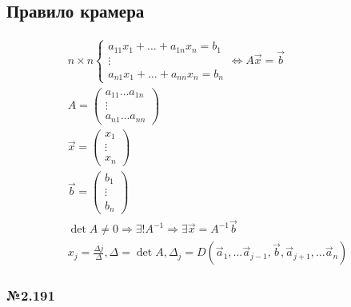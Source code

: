 \documentclass{article}
\begin{document}
\subsection{Правило крамера}

\begin{gather*}
	n \times n \begin{cases}
		a_{11} x_1 + \dots + a_{1n} x_n = b_1 \\
		\vdots \\
		a_{n1} x_1 + \dots + a_{nn} x_n = b_n
	\end{cases}
	\Leftrightarrow
	A \vec{x} = \vec{b} \\
	A = \begin{pmatrix}
		a_{11} \dots a_{1n} \\
		\vdots \\
		a_{n1} \dots a_{nn}
	\end{pmatrix} \\
	\vec{x} = \begin{pmatrix}
		x_1 \\
		\vdots \\
		x_n
	\end{pmatrix} \\
	\vec{b} = \begin{pmatrix}
		b_1 \\
		\vdots \\
		b_n
	\end{pmatrix} \\
	\det A \ne 0 \Rightarrow \exists ! A^{-1} \Rightarrow \exists \vec{x} = A^{-1} \vec{b} \\
	x_j = \frac{\Delta j}{\Delta}, \Delta = \det A, \Delta_j = D(\vec{a}_1, \dots \vec{a}_{j - 1}, \vec{b}, \vec{a}_{j + 1}, \dots \vec{a}_n)
\end{gather*}

\subsubsection*{№2.191}
\end{document}
